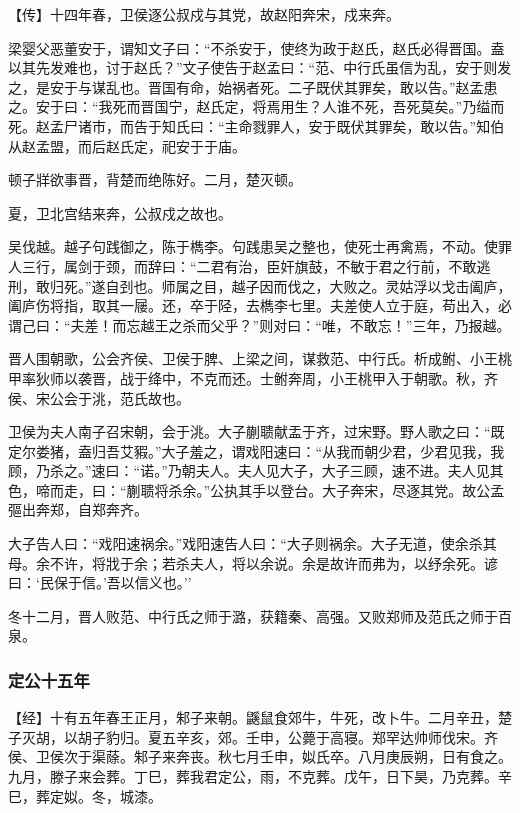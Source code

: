 \documentclass[]{article}
\begin{document}
【传】十四年春，卫侯逐公叔戍与其党，故赵阳奔宋，戍来奔。

梁婴父恶董安于，谓知文子曰：``不杀安于，使终为政于赵氏，赵氏必得晋国。盍以其先发难也，讨于赵氏？''文子使告于赵孟曰：``范、中行氏虽信为乱，安于则发之，是安于与谋乱也。晋国有命，始祸者死。二子既伏其罪矣，敢以告。''赵孟患之。安于曰：``我死而晋国宁，赵氏定，将焉用生？人谁不死，吾死莫矣。''乃缢而死。赵孟尸诸市，而告于知氏曰：``主命戮罪人，安于既伏其罪矣，敢以告。''知伯从赵孟盟，而后赵氏定，祀安于于庙。

顿子牂欲事晋，背楚而绝陈好。二月，楚灭顿。

夏，卫北宫结来奔，公叔戍之故也。

吴伐越。越子句践御之，陈于檇李。句践患吴之整也，使死士再禽焉，不动。使罪人三行，属剑于颈，而辞曰：``二君有治，臣奸旗鼓，不敏于君之行前，不敢逃刑，敢归死。''遂自刭也。师属之目，越子因而伐之，大败之。灵姑浮以戈击阖庐，阖庐伤将指，取其一屦。还，卒于陉，去檇李七里。夫差使人立于庭，苟出入，必谓己曰：``夫差！而忘越王之杀而父乎？''则对曰：``唯，不敢忘！''三年，乃报越。

晋人围朝歌，公会齐侯、卫侯于脾、上梁之间，谋救范、中行氏。析成鲋、小王桃甲率狄师以袭晋，战于绛中，不克而还。士鲋奔周，小王桃甲入于朝歌。秋，齐侯、宋公会于洮，范氏故也。

卫侯为夫人南子召宋朝，会于洮。大子蒯聩献盂于齐，过宋野。野人歌之曰：``既定尔娄猪，盍归吾艾豭。''大子羞之，谓戏阳速曰：``从我而朝少君，少君见我，我顾，乃杀之。''速曰：``诺。''乃朝夫人。夫人见大子，大子三顾，速不进。夫人见其色，啼而走，曰：``蒯聩将杀余。''公执其手以登台。大子奔宋，尽逐其党。故公孟彄出奔郑，自郑奔齐。

大子告人曰：``戏阳速祸余。''戏阳速告人曰：``大子则祸余。大子无道，使余杀其母。余不许，将戕于余；若杀夫人，将以余说。余是故许而弗为，以纾余死。谚曰：`民保于信。'吾以信义也。''

冬十二月，晋人败范、中行氏之师于潞，获籍秦、高强。又败郑师及范氏之师于百泉。

\hypertarget{header-n3031}{%
\subsubsection{定公十五年}\label{header-n3031}}

【经】十有五年春王正月，邾子来朝。鼷鼠食郊牛，牛死，改卜牛。二月辛丑，楚子灭胡，以胡子豹归。夏五辛亥，郊。壬申，公薨于高寝。郑罕达帅师伐宋。齐侯、卫侯次于渠蒢。邾子来奔丧。秋七月壬申，姒氏卒。八月庚辰朔，日有食之。九月，滕子来会葬。丁巳，葬我君定公，雨，不克葬。戊午，日下昊，乃克葬。辛巳，葬定姒。冬，城漆。
\end{document}

